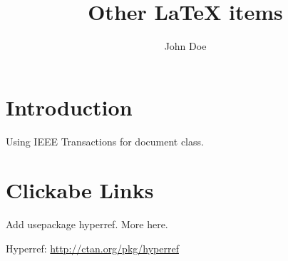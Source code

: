 \documentclass{IEEEtran}
\title{Other LaTeX items}
\author{John Doe}
\date{}
\begin{document}
\maketitle

\section{Introduction}

Using IEEE Transactions for document class.

\section{Clickabe Links}

Add usepackage hyperref. More here.

\noindent
Hyperref: \url{http://ctan.org/pkg/hyperref}
\end{document}
